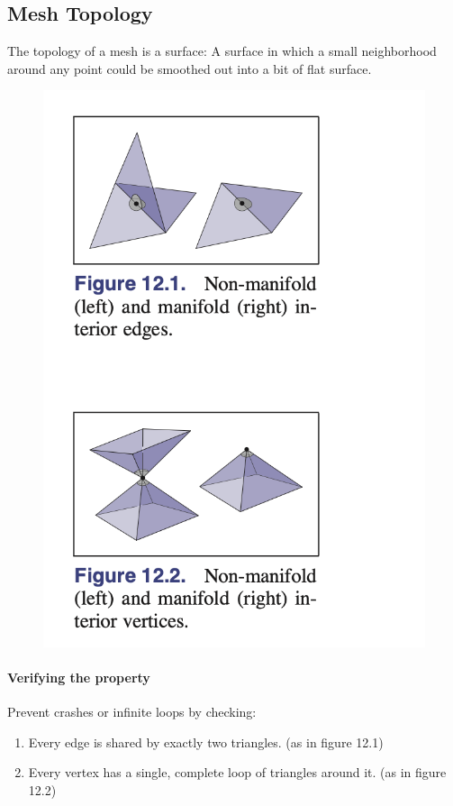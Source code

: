 \documentclass[11pt]{article}
\numberwithin{equation}{section}
\begin{document}
\subsection{Mesh Topology}
The topology of a mesh is a  surface: A surface in which a small neighborhood around any point could be smoothed out into a bit of flat surface.
\begin{figure}[H]
	\centering
	\includegraphics[scale=0.6]{p16}
\end{figure}
\paragraph{Verifying the property}
Prevent crashes or infinite loops by checking:
\begin{enumerate}
	\item Every edge is shared by exactly two triangles.	 (as in figure 12.1)
	\item Every vertex has a single, complete loop of triangles around it. (as in figure 12.2)
\end{enumerate}
\end{document}
